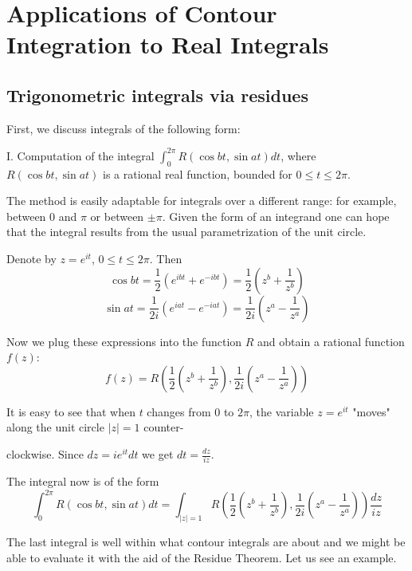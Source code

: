 \section{Applications of Contour Integration to Real Integrals}

\subsection{Trigonometric integrals via residues}

First, we discuss integrals of the following form:

I. Computation of the integral $\int_0^{2\pi} R(\cos bt, \sin at) dt$, where $R(\cos bt, \sin at)$ is a rational real function, bounded for $0 \le t \le 2\pi$.

The method is easily adaptable for integrals over a different range: for example, between $0$ and $\pi$ or between $\pm \pi$. Given the form of an integrand one can hope that the integral results from the usual parametrization of the unit circle.

Denote by $z = e^{it}$, $0 \le t \le 2\pi$. Then
\[
\cos bt = \frac{1}{2} (e^{ibt} + e^{-ibt}) = \frac{1}{2} (z^b + \frac{1}{z^b})
\]
\[
\sin at = \frac{1}{2i} (e^{iat} - e^{-iat}) = \frac{1}{2i} (z^a - \frac{1}{z^a})
\]

Now we plug these expressions into the function $R$ and obtain a rational function $f(z)$:
\[
f(z) = R \left( \frac{1}{2} (z^b + \frac{1}{z^b}), \frac{1}{2i} (z^a - \frac{1}{z^a}) \right)
\]

It is easy to see that when $t$ changes from $0$ to $2\pi$, the variable $z = e^{it}$ "moves" along the unit circle $|z| = 1$ counter-


clockwise. Since $dz = ie^{it} dt$ we get $dt = \frac{dz}{iz}$.

The integral now is of the form
\[
\int_0^{2\pi} R(\cos bt, \sin at) dt = \int_{|z|=1} R \left( \frac{1}{2} (z^b + \frac{1}{z^b}), \frac{1}{2i} (z^a - \frac{1}{z^a}) \right) \frac{dz}{iz}
\]

The last integral is well within what contour integrals are about and we might be able to evaluate it with the aid of the Residue Theorem. Let us see an example.

